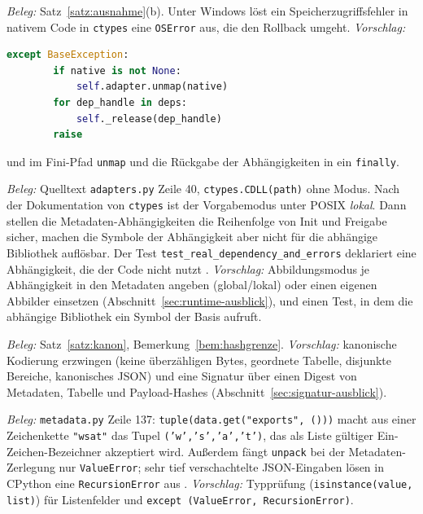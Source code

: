 \begin{befund}
	\label{bef:exc}
	\emph{Beleg:} Satz~\ref{satz:ausnahme}(b). Unter Windows löst ein Speicherzugriffsfehler in nativem Code in \texttt{ctypes} eine \texttt{OSError} aus, die den Rollback umgeht. \emph{Vorschlag:}
\begin{lstlisting}[language=Python]
    except BaseException:
        if native is not None:
            self.adapter.unmap(native)
        for dep_handle in deps:
            self._release(dep_handle)
        raise
\end{lstlisting}
	und im Fini-Pfad \texttt{unmap} und die Rückgabe der Abhängigkeiten in ein \texttt{finally}.
\end{befund}

\begin{befund}
	\label{bef:native}
	\emph{Beleg:} Quelltext \texttt{adapters.py} Zeile 40, \texttt{ctypes.CDLL(path)} ohne Modus. Nach der Dokumentation von \texttt{ctypes} ist der Vorgabemodus unter POSIX \emph{lokal}. Dann stellen die Metadaten-Abhängigkeiten die Reihenfolge von Init und Freigabe sicher, machen die Symbole der Abhängigkeit aber nicht für die abhängige Bibliothek auflösbar. Der Test \texttt{test\_real\_dependency\_and\_errors} deklariert eine Abhängigkeit, die der Code nicht nutzt . \emph{Vorschlag:} Abbildungsmodus je Abhängigkeit in den Metadaten angeben (global/lokal) oder einen eigenen Abbilder einsetzen (Abschnitt~\ref{sec:runtime-ausblick}), und einen Test, in dem die abhängige Bibliothek ein Symbol der Basis aufruft.
\end{befund}

\begin{befund}
	\label{bef:canon}
	\emph{Beleg:} Satz~\ref{satz:kanon}, Bemerkung~\ref{bem:hashgrenze}. \emph{Vorschlag:} kanonische Kodierung erzwingen (keine überzähligen Bytes, geordnete Tabelle, disjunkte Bereiche, kanonisches JSON) und eine Signatur über einen Digest von Metadaten, Tabelle und Payload-Hashes (Abschnitt~\ref{sec:signatur-ausblick}).
\end{befund}

\begin{befund}
	\label{bef:parse}
	\emph{Beleg:} \texttt{metadata.py} Zeile 137: \texttt{tuple(data.get("exports", ()))} macht aus einer Zeichenkette \texttt{"wsat"} das Tupel \texttt{('w','s','a','t')}, das als Liste gültiger Ein-Zeichen-Bezeichner akzeptiert wird. Außerdem fängt \texttt{unpack} bei der Metadaten-Zerlegung nur \texttt{ValueError}; sehr tief verschachtelte JSON-Eingaben lösen in CPython eine \texttt{RecursionError} aus . \emph{Vorschlag:} Typprüfung (\texttt{isinstance(value, list)}) für Listenfelder und \texttt{except (ValueError, RecursionError)}.
\end{befund}

